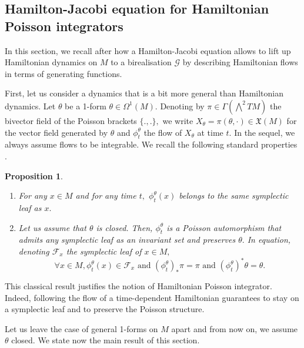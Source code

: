 \documentclass[a4paper,11pt]{article}
\newtheorem{proposition}[theorem]{Proposition}
\def\ts{\thinspace}
\begin{document}
\subsection{Hamilton-Jacobi equation for Hamiltonian Poisson integrators}

In this section, we recall after \cite{oscar} how a Hamilton-Jacobi equation allows to lift up Hamiltonian dynamics on $M$ to a birealisation $\mathcal{G}$ by describing Hamiltonian flows in terms of generating functions.

First, let us consider a dynamics that is a bit more general than Hamiltonian dynamics. Let $\theta$ be a 1-form $\theta \in \Omega^1(M).$ Denoting by $\pi \in \Gamma(\bigwedge^2 TM)$ the bivector field of the Poisson brackets $\{.,.\},$ we write $X_{\theta} = \pi(\theta, \cdot) \in \mathfrak{X}(M)$ for the vector field generated by $\theta$ and $\phi_t^{\theta}$ the flow of $X_{\theta}$ at time $t.$ In the sequel, we always assume flows to be integrable. We recall the following standard properties \cite[Chap.\ts III]{Marle1987}.

\begin{proposition}\label{prop:1form_flow}
\begin{enumerate}
\item For any $x \in M$ and for any time $t,$ $\phi_t^{\theta}(x)$ belongs to the same symplectic leaf as $x.$
\item Let us assume that $\theta$ is closed. Then, $\phi_t^{\theta}$ is a Poisson automorphism that admits any symplectic leaf as an invariant set and preserves $\theta.$ In equation, denoting $\mathcal{F}_x$ the symplectic leaf of $x \in M,$
\[
\forall x \in M, \phi_t^{\theta}(x) \in \mathcal{F}_x \text{ and }  (\phi_t^{\theta})_{*} \pi = \pi \text{ and } (\phi_t^{\theta})^* \theta = \theta.
\]
\end{enumerate}
\end{proposition}

This classical result justifies the notion of Hamiltonian Poisson integrator. Indeed, following the flow of a time-dependent Hamiltonian guarantees to stay on a symplectic leaf and to preserve the Poisson structure.

Let us leave the case of general 1-forms on $M$ apart and from now on, we assume $\theta$ closed. We state now the main result of this section.
\end{document}
